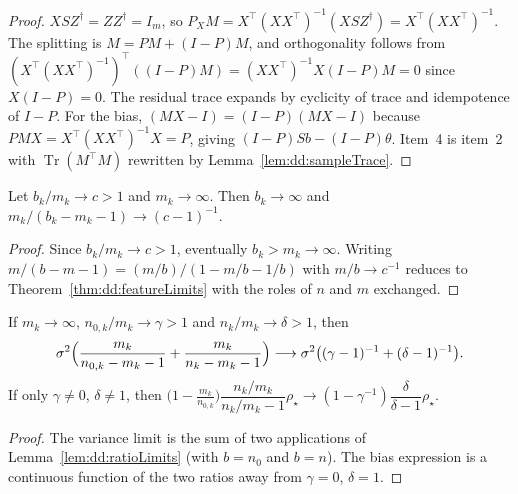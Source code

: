 \begin{proof}
  \leanok
$XSZ^\dagger=ZZ^\dagger=I_m$, so $P_X M=X^\top(XX^\top)^{-1}(X S Z^\dagger)=X^\top(XX^\top)^{-1}$. The splitting is $M=PM+(I-P)M$, and orthogonality follows from $(X^\top(XX^\top)^{-1})^\top((I-P)M)=(XX^\top)^{-1}X(I-P)M=0$ since $X(I-P)=0$. The residual trace expands by cyclicity of trace and idempotence of $I-P$. For the bias, $(MX-I)=(I-P)(MX-I)$ because $PMX=X^\top(XX^\top)^{-1}X=P$, giving $(I-P)Sb-(I-P)\theta$. Item~4 is item~2 with $\operatorname{Tr}(M^\top M)$ rewritten by Lemma~\ref{lem:dd:sampleTrace}.
\end{proof}

\begin{lemma}\label{lem:dd:ratioLimits}
  \leanok
Let $b_k/m_k\to c>1$ and $m_k\to\infty$. Then $b_k\to\infty$ and $m_k/(b_k-m_k-1)\to(c-1)^{-1}$.
\end{lemma}

\begin{proof}
  \leanok
Since $b_k/m_k\to c>1$, eventually $b_k>m_k\to\infty$. Writing $m/(b-m-1)=(m/b)/(1-m/b-1/b)$ with $m/b\to c^{-1}$ reduces to
Theorem~\ref{thm:dd:featureLimits} with the roles of $n$ and $m$ exchanged.
\end{proof}

\begin{theorem}\label{thm:dd:sampleLimits}
  \leanok
If $m_k\to\infty$, $n_{0,k}/m_k\to\gamma>1$ and $n_k/m_k\to\delta>1$, then
\[
  \sigma^2\Bigl(\frac{m_k}{n_{0,k}-m_k-1}+\frac{m_k}{n_k-m_k-1}\Bigr)\longrightarrow\sigma^2\bigl((\gamma-1)^{-1}+(\delta-1)^{-1}\bigr).
\]
If only $\gamma\ne0$, $\delta\ne1$, then
$\bigl(1-\tfrac{m_k}{n_{0,k}}\bigr)\dfrac{n_k/m_k}{n_k/m_k-1}\rho_\star\to(1-\gamma^{-1})\dfrac{\delta}{\delta-1}\rho_\star$.
\end{theorem}

\begin{proof}
  \leanok
The variance limit is the sum of two applications of Lemma~\ref{lem:dd:ratioLimits} (with $b=n_0$ and $b=n$). The bias
expression is a continuous function of the two ratios away from $\gamma=0$, $\delta=1$.
\end{proof}


